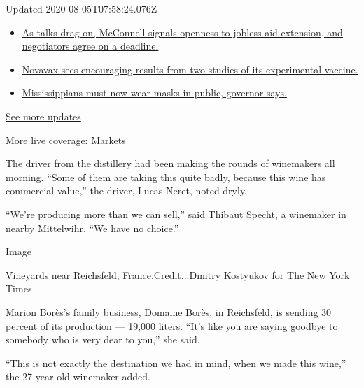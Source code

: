 Updated 2020-08-05T07:58:24.076Z

\begin{itemize}
\tightlist
\item
  \href{https://www.nytimes3xbfgragh.onion/2020/08/04/world/coronavirus-cases.html?action=click\&pgtype=Article\&state=default\&region=MAIN_CONTENT_1\&context=storylines_live_updates\#link-762df92}{As
  talks drag on, McConnell signals openness to jobless aid extension,
  and negotiators agree on a deadline.}
\item
  \href{https://www.nytimes3xbfgragh.onion/2020/08/04/world/coronavirus-cases.html?action=click\&pgtype=Article\&state=default\&region=MAIN_CONTENT_1\&context=storylines_live_updates\#link-1228a480}{Novavax
  sees encouraging results from two studies of its experimental
  vaccine.}
\item
  \href{https://www.nytimes3xbfgragh.onion/2020/08/04/world/coronavirus-cases.html?action=click\&pgtype=Article\&state=default\&region=MAIN_CONTENT_1\&context=storylines_live_updates\#link-794484ed}{Mississippians
  must now wear masks in public, governor says.}
\end{itemize}

\href{https://www.nytimes3xbfgragh.onion/2020/08/04/world/coronavirus-cases.html?action=click\&pgtype=Article\&state=default\&region=MAIN_CONTENT_1\&context=storylines_live_updates}{See
more updates}

More live coverage:
\href{https://www.nytimes3xbfgragh.onion/live/2020/08/04/business/stock-market-today-coronavirus?action=click\&pgtype=Article\&state=default\&region=MAIN_CONTENT_1\&context=storylines_live_updates}{Markets}

The driver from the distillery had been making the rounds of winemakers
all morning. ``Some of them are taking this quite badly, because this
wine has commercial value,'' the driver, Lucas Neret, noted dryly.

``We're producing more than we can sell,'' said Thibaut Specht, a
winemaker in nearby Mittelwihr. ``We have no choice.''

Image

Vineyards near Reichsfeld, France.Credit...Dmitry Kostyukov for The New
York Times

Marion Borès's family business, Domaine Borès, in Reichsfeld, is sending
30 percent of its production --- 19,000 liters. ``It's like you are
saying goodbye to somebody who is very dear to you,'' she said.

``This is not exactly the destination we had in mind, when we made this
wine,'' the 27-year-old winemaker added.

